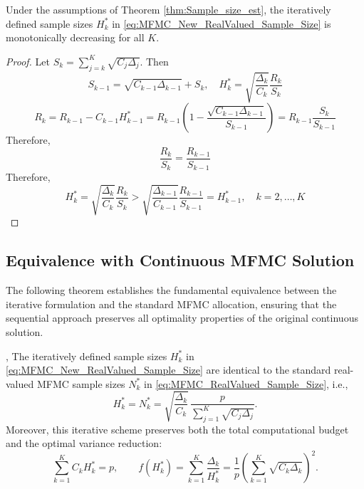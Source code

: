 %
\begin{theorem}\label{thm:Monotonicity_H_k}
Under the assumptions of Theorem \ref{thm:Sample_size_est}, the iteratively defined sample sizes $H_k^*$ in \eqref{eq:MFMC_New_RealValued_Sample_Size} is monotonically decreasing for all $K$.
\end{theorem}
%
\begin{proof}
Let $S_k = \sum_{j=k}^K \sqrt{C_j\Delta_j}$. Then
\[
S_{k-1} = \sqrt{C_{k-1}\Delta_{k-1}}+S_k, \quad H_k^* = \sqrt{\frac{\Delta_k}{C_k}}\frac{R_k}{S_k}
\]
\[
R_k = R_{k-1}-C_{k-1}H_{k-1}^* = R_{k-1}\left(1-\frac{\sqrt{C_{k-1}\Delta_{k-1}}}{S_{k-1}}\right) = R_{k-1}\frac{S_k}{S_{k-1}}
\]
Therefore, 
\[
\frac{R_k}{S_k} = \frac{R_{k-1}}{S_{k-1}}
\]
Therefore,
\[
H_k^* = \sqrt{\frac{\Delta_k}{C_k}}\frac{R_k}{S_k}>\sqrt{\frac{\Delta_{k-1}}{C_{k-1}}}\frac{R_{k-1}}{S_{k-1}} = H_{k-1}^*, \quad k=2,\ldots,K
\]

\end{proof}


\subsection{Equivalence with Continuous MFMC Solution}

The following theorem establishes the fundamental equivalence between the iterative formulation and the standard MFMC allocation, ensuring that the sequential approach preserves all optimality properties of the original continuous solution.

%
\begin{theorem}\label{thm:MFMC_Iterative_RealValued_Sample_Size}
,
The iteratively defined sample sizes $H_k^*$ in \eqref{eq:MFMC_New_RealValued_Sample_Size} are identical to the standard real-valued MFMC sample sizes $N_k^*$ in \eqref{eq:MFMC_RealValued_Sample_Size}, i.e.,
\[
H_k^* = N_k^*
    = \sqrt{\frac{\Delta_k}{C_k}}\,
      \frac{p}{\sum_{j=1}^K \sqrt{C_j\Delta_j}}.
\]
Moreover, this iterative scheme preserves both the total computational budget and the optimal variance reduction:
\[
\sum_{k=1}^K C_k H_k^* = p, 
\qquad  
f(H_k^*) = \sum_{k=1}^K \frac{\Delta_k}{H_k^*} = \frac{1}{p} \left(\sum_{k=1}^K \sqrt{C_k\Delta_k}\right)^2.
\]
\end{theorem}
%


